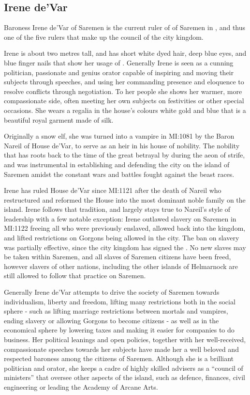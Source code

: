 \subsection{Irene de'Var}
\label{sec:Irene deVar}

Baroness Irene de'Var of Saremen is the current ruler of  of Saremen in , and thus one of the five
rulers that make up the council of the city kingdom.

Irene is about two metres tall, and has short white dyed hair, deep blue eyes,
and blue finger nails that show her usage of . Generally
Irene is seen as a cunning politician, passionate and genius orator capable of
inspiring and moving their subjects through speeches, and using her commanding
presence and eloquence to resolve conflicts through negotiation. To her people
she shows her warmer, more compassionate side, often meeting her own subjects
on festivities or other special occasions. She wears a regalia in the house's
colours white gold and blue that is a beautiful royal garment made of silk.

Originally a snow elf, she was turned into a vampire in MI:1081 by the Baron
Nareil of House de'Var, to serve as an heir in his house of nobility. The
nobility that has roots back to the time of the great betrayal by
 during the aeon of strife, and was instrumental in
establishing and defending the city on the island of Saremen amidst the
constant wars and battles fought against the beast races.

Irene has ruled House de'Var since MI:1121 after the death of Nareil who
restructured and reformed the House into the most dominant noble family on the
island. Irene follows that tradition, and largely stays true to Nareil's style
of leadership with a few notable exception: Irene outlawed slavery on Saremen
in MI:1122 freeing all who were previously enslaved, allowed 
back into the kingdom, and lifted restrictions on Gorgons being allowed in the
city. The ban on slavery was partially effective, since the city kingdom has
signed the . No new slaves may be taken within
Saremen, and all slaves of Saremen citizens have been freed, however slavers
of other nations, including the other islands of Helmarnock are still allowed
to follow that practice on Saremen.

Generally Irene de'Var attempts to drive the society of Saremen towards
individualism, liberty and freedom, lifting many restrictions both in the
social sphere - such as lifting marriage restrictions between mortals and
vampires, ending slavery or allowing Gorgons to become citizens - as well as
in the economical sphere by lowering taxes and making it easier for companies
to do business. Her political leanings and open policies, together with her
well-received, compassionate speeches towards her subjects have made her a
well beloved and respected baroness among the citizens of Saremen. Although
she is a brilliant politician and orator, she keeps a cadre of highly skilled
advisers as a ``council of ministers'' that oversee other aspects of the
island, such as defence, finances, civil engineering or leading the Academy of
Arcane Arts.

